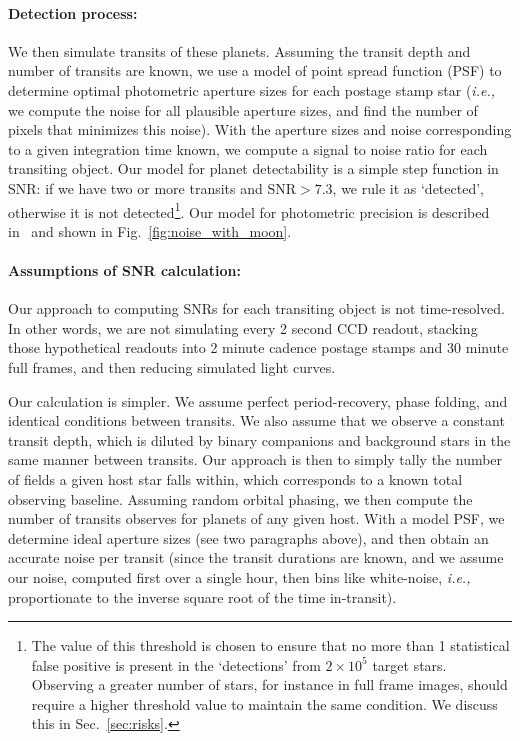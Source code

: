 \paragraph{Detection process:}
We then simulate transits of these planets.
Assuming the transit depth and number of transits are known, we
use a model of \tesss point spread function (PSF) to determine optimal photometric aperture sizes for each postage stamp star (\textit{i.e.,} we compute the noise for all plausible aperture sizes, and find the number of pixels that minimizes this noise).
With the aperture sizes and noise corresponding to a given integration time known, we compute a signal to noise ratio for each transiting object.
Our model for planet detectability is a simple step function in SNR: if we have two or more transits and $\text{SNR} > 7.3$, we rule it as `detected', otherwise it is not detected\footnote{The value of this threshold is chosen to ensure that no more than 1 statistical false positive is present in the `detections' from $2\times10^5$ target stars. Observing a greater number of stars, for instance in full frame images, should require a higher threshold value to maintain the same condition. We discuss this in Sec.~\protect\ref{sec:risks}.}. 
Our model for \tesss photometric precision is described in~ and shown in Fig.~\ref{fig:noise_with_moon}.

\paragraph{Assumptions of SNR calculation:}
Our approach to computing SNRs for each transiting object is not time-resolved. 
In other words, we are not simulating every 2 second CCD readout, stacking those hypothetical readouts into 2 minute cadence postage stamps and 30 minute full frames, and then reducing simulated light curves.

Our calculation is simpler. 
We assume perfect period-recovery, phase folding, and identical conditions between transits. %
We also assume that we observe a constant transit depth, which is diluted by binary companions and background stars in the same manner between transits.
Our approach is then to simply tally the number of \tess fields a given host star falls within, which corresponds to a known total observing baseline.
Assuming random orbital phasing, we then compute the number of transits \tess observes for planets of any given host.
With a model PSF, we determine ideal aperture sizes (see two paragraphs above), and then obtain an accurate noise per transit (since the transit durations are known, and we assume our noise, computed first over a single hour, then bins like white-noise, \textit{i.e.,} proportionate to the inverse square root of the time in-transit).

